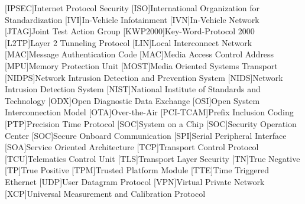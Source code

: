 \begin{acronym}
[IPSEC]{Internet Protocol Security}
[ISO]{International Organization for Standardization}
[IVI]{In-Vehicle Infotainment}
[IVN]{In-Vehicle Network}
[JTAG]{Joint Test Action Group}
[KWP2000]{Key-Word-Protocol 2000}
[L2TP]{Layer 2 Tunneling Protocol}
[LIN]{Local Interconnect Network}
[MAC]{Message Authentication Code} 	%
[MAC]{Media Access Control Address}	%
[MPU]{Memory Protection Unit}
[MOST]{Media Oriented Systems Transport}
[NIDPS]{Network Intrusion Detection and Prevention System}
[NIDS]{Network Intrusion Detection System}
[NIST]{National Institute of Standards and Technology}
[ODX]{Open Diagnostic Data Exchange}
[OSI]{Open System Interconnection Model}
[OTA]{Over-the-Air}
[PCI-TCAM]{Prefix Inclusion Coding} 				%
[PTP]{Precision Time Protocol}
[SOC]{System on a Chip}
[SOC]{Security Operation Center}
[SOC]{Secure Onboard Communication}          %
[SPI]{Serial Peripheral Interface}
[SOA]{Service Oriented Architecture}
[TCP]{Transport Control Protocol}
[TCU]{Telematics Control Unit}
[TLS]{Transport Layer Security}
[TN]{True Negative}
[TP]{True Positive}
[TPM]{Trusted Platform Module}
[TTE]{Time Triggered Ethernet}		%
[UDP]{User Datagram Protocol}
[VPN]{Virtual Private Network}
[XCP]{Universal Measurement and Calibration Protocol}
\end{acronym}
